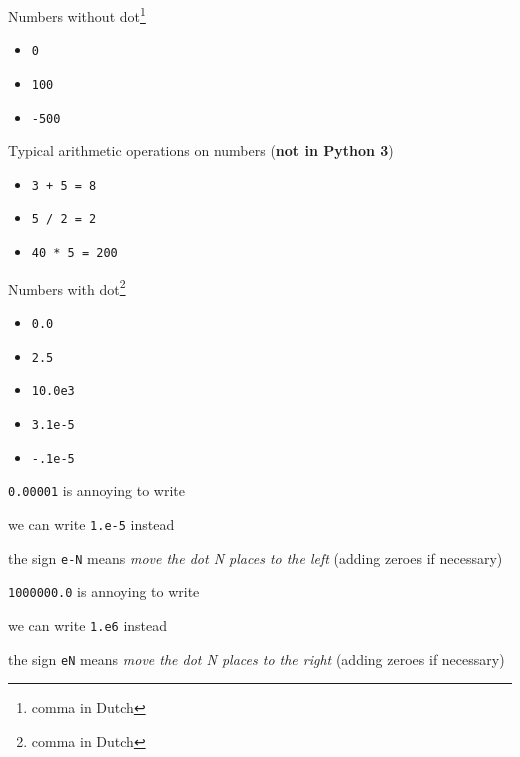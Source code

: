 \documentclass{beamer}
\begin{document}
\begin{slide}{
\item Numbers without dot\footnote{comma in Dutch}
\begin{itemize}
\item \texttt{0}
\item \texttt{100} 
\item \texttt{-500}
\end{itemize}
}\end{slide}

\begin{slide}{
\item Typical arithmetic operations on numbers (\textbf{not in Python 3})
\begin{itemize}
\item \texttt{3 + 5 = 8}
\item \texttt{5 / 2 = 2}
\item \texttt{40 * 5 = 200}
\end{itemize} 
}\end{slide}

\begin{slide}{
\item Numbers with dot\footnote{comma in Dutch}
\begin{itemize}
\item \texttt{0.0}
\item \texttt{2.5}
\item \texttt{10.0e3}
\item \texttt{3.1e-5}
\item \texttt{-.1e-5}
\end{itemize}
}\end{slide}

\begin{slide}{
\item \texttt{0.00001} is annoying to write
\item we can write \texttt{1.e-5} instead
\item the sign \texttt{e-N} means \textit{move the dot N places to the left} (adding zeroes if necessary)
}\end{slide}

\begin{slide}{
\item \texttt{1000000.0} is annoying to write
\item we can write \texttt{1.e6} instead
\item the sign \texttt{eN} means \textit{move the dot N places to the right} (adding zeroes if necessary)
}\end{slide}
\end{document}
